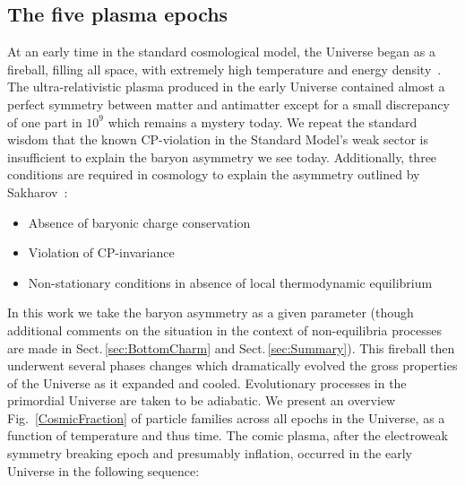 \documentclass[universe,article,submit,moreauthors,pdftex,a4paper]{Definitions/mdpi}
\newcommand*{\rf}[1]{Fig.~{\ref{#1}}}
\newcommand*{\rsec}[1]{Sect.\,{\ref{#1}}}
\begin{document}
\subsection{The five plasma epochs}\label{sec:Timeline}
\noindent At an early time in the standard cosmological model, the Universe began as a fireball, filling all space, with extremely high temperature and energy density~\cite{Rafelski:2015cxa}. The ultra-relativistic plasma produced in the early Universe contained almost a perfect symmetry between matter and antimatter except for a small discrepancy of one part in $10^{9}$ which remains a mystery today. We repeat the standard wisdom that the known CP-violation in the Standard Model's weak sector is insufficient to explain the baryon asymmetry we see today. Additionally, three conditions are required in cosmology to explain the asymmetry outlined by Sakharov~\cite{Sakharov:1967dj,Sakharov:1988vdp}:
\begin{itemize}
 \item Absence of baryonic charge conservation 
 \item Violation of CP-invariance
 \item Non-stationary conditions in absence of local thermodynamic equilibrium
\end{itemize}
In this work we take the baryon asymmetry as a given parameter (though additional comments on the situation in the context of non-equilibria processes are made in \rsec{sec:BottomCharm} and \rsec{sec:Summary}). This fireball then underwent several phases changes which dramatically evolved the gross properties of the Universe as it expanded and cooled. Evolutionary processes in the primordial Universe are taken to be adiabatic. We present an overview \rf{CosmicFraction} of particle families across all epochs in the Universe, as a function of temperature and thus time. The comic plasma, after the electroweak symmetry breaking epoch and presumably inflation, occurred in the early Universe in the following sequence:
\end{document}
